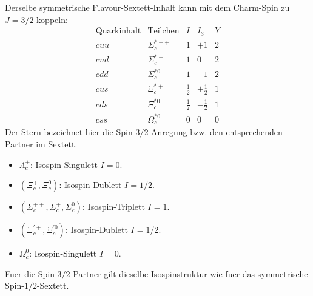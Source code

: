 \documentclass[11pt,a4paper]{scrartcl}
\begin{document}
\begin{calculationbox}[title={Gruppe (iii): \(J^P=\frac32^+\), leichtes Paar mit Spin 1}]
Derselbe symmetrische Flavour-Sextett-Inhalt kann mit dem Charm-Spin zu \(J=3/2\) koppeln:
\[
\begin{array}{c|c|c|c|c}
\text{Quarkinhalt} & \text{Teilchen} & I & I_3 & Y\\\hline
cuu & \Sigma_c^{\ast ++} & 1 & +1 & 2\\
cud & \Sigma_c^{\ast +} & 1 & 0 & 2\\
cdd & \Sigma_c^{\ast 0} & 1 & -1 & 2\\
cu s & \Xi_c^{\ast +} & \frac12 & +\frac12 & 1\\
cd s & \Xi_c^{\ast 0} & \frac12 & -\frac12 & 1\\
css & \Omega_c^{\ast 0} & 0 & 0 & 0
\end{array}
\]
Der Stern bezeichnet hier die Spin-\(3/2\)-Anregung bzw. den entsprechenden Partner im Sextett.
\end{calculationbox}

\begin{calculationbox}[title={(b) Isospin-Multipletts}]
\begin{itemize}
\item \(\Lambda_c^+\): Isospin-Singulett \(I=0\).
\item \((\Xi_c^+,\Xi_c^0)\): Isospin-Dublett \(I=1/2\).
\item \((\Sigma_c^{++},\Sigma_c^+,\Sigma_c^0)\): Isospin-Triplett \(I=1\).
\item \((\Xi_c^{\prime +},\Xi_c^{\prime 0})\): Isospin-Dublett \(I=1/2\).
\item \(\Omega_c^0\): Isospin-Singulett \(I=0\).
\end{itemize}
Fuer die Spin-\(3/2\)-Partner gilt dieselbe Isospinstruktur wie fuer das symmetrische Spin-\(1/2\)-Sextett.
\end{calculationbox}
\end{document}
